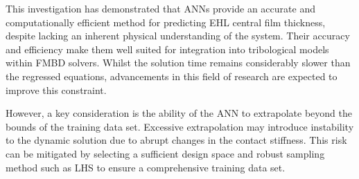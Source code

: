 This investigation has demonstrated that ANNs provide an accurate and computationally efficient method for predicting EHL central film thickness, despite lacking an inherent physical understanding of the system. Their accuracy and efficiency make them well suited for integration into tribological models within FMBD solvers. Whilst the solution time remains considerably slower than the regressed equations, advancements in this field of research are expected to improve this constraint. 

However, a key consideration is the ability of the ANN to extrapolate beyond the bounds of the training data set. Excessive extrapolation may introduce instability to the dynamic solution due to abrupt changes in the contact stiffness. This risk can be mitigated by selecting a sufficient design space and robust sampling method such as LHS to ensure a comprehensive training data set.